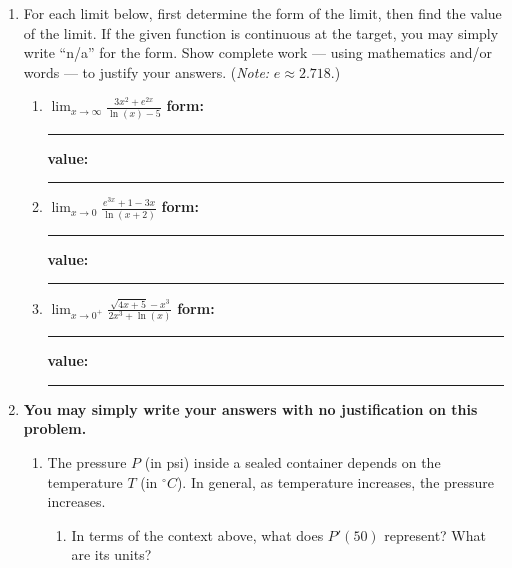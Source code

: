 \documentclass[11pt]{article}
\begin{document}
\begin{enumerate}
\item For each limit below, first determine the form of the limit, then find the value of the limit. 
If the given function is continuous at the target, you may simply write ``n/a'' for the form. 
Show complete work --- using mathematics and/or words --- to justify your answers. 
({\it Note:} $e \approx 2.718$.)


\begin{enumerate}
    \item[(a)] $\displaystyle\lim_{x\to\infty} \frac{3x^2 + e^{2x}}{\ln(x) - 5}$
    \hspace{1cm}
    \textbf{form:} \rule[-6pt]{1.25in}{0.4pt} \quad
    \textbf{value:} \rule[-6pt]{1.25in}{0.4pt}
    \vspace{5cm}

    \item[(b)] 
    $\displaystyle\lim_{x\to0} \frac{e^{3x} + 1 - 3x}{\ln(x + 2)}$
    \hspace{1cm}
    \textbf{form:} \rule[-6pt]{1.25in}{0.4pt} \quad
    \textbf{value:} \rule[-6pt]{1.25in}{0.4pt}
    \vspace{5cm}

    \item[(c)] 
    $\displaystyle\lim_{x\to 0^{+}} \frac{\sqrt{4x + 5} - x^3}{2x^3 + \ln(x)}$
    \hspace{1cm}
    \textbf{form:} \rule[-6pt]{1.25in}{0.4pt} \quad
    \textbf{value:} \rule[-6pt]{1.25in}{0.4pt}
    \vspace{0.3in}
\end{enumerate}

\newpage

\item {\bf You may simply write your answers with no justification on this problem.}

\begin{enumerate}
    \item The pressure $P$ (in psi) inside a sealed container depends on the temperature $T$ (in ${}^{\circ}\!C$). In general, as temperature increases, the pressure increases.
    \begin{enumerate}
        \item In terms of the context above, what does $P'(50)$ represent? What are its units?


\end{enumerate}
\end{enumerate}
\end{enumerate}
\end{document}
